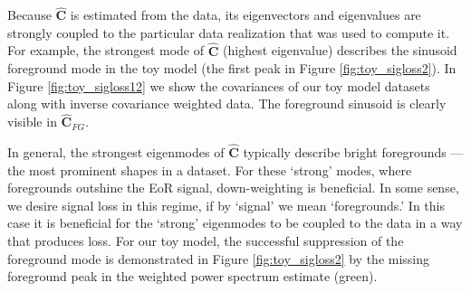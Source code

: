 \documentclass[preprint2,numberedappendix,tighten]{aastex6}  %
\begin{document}
Because $\widehat{\textbf{C}}$ is estimated from the data, its eigenvectors and eigenvalues are strongly coupled to the particular data realization that was used to compute it. For example, the strongest mode of $\widehat{\textbf{C}}$ (highest eigenvalue) describes the sinusoid foreground mode in the toy model (the first peak in Figure \ref{fig:toy_sigloss2}). In Figure \ref{fig:toy_sigloss12} we show the covariances of our toy model datasets along with inverse covariance weighted data. The foreground sinusoid is clearly visible in $\widehat{\textbf{C}}_{FG}$.

In general, the strongest eigenmodes of $\widehat{\textbf{C}}$ typically describe bright foregrounds --- the most prominent shapes in a dataset. For these `strong' modes, where foregrounds outshine the EoR signal, down-weighting is beneficial. In some sense, we desire signal loss in this regime, if by `signal' we mean `foregrounds.' In this case it is beneficial for the `strong' eigenmodes to be coupled to the data in a way that produces loss. For our toy model, the successful suppression of the foreground mode is demonstrated in Figure \ref{fig:toy_sigloss2} by the missing foreground peak in the weighted power spectrum estimate (green).

\end{document}
